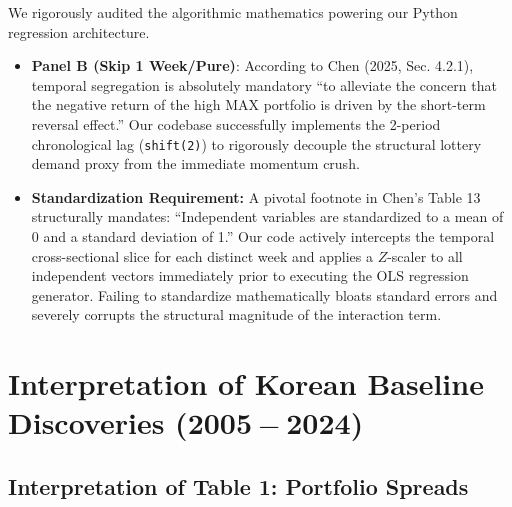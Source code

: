 \documentclass[11pt,a4paper]{article}
\begin{document}
We rigorously audited the algorithmic mathematics powering our Python regression architecture.
\begin{itemize}
    \item \textbf{Panel B (Skip 1 Week/Pure)}: According to Chen (2025, Sec. 4.2.1), temporal segregation is absolutely mandatory ``to alleviate the concern that the negative return of the high MAX portfolio is driven by the short-term reversal effect.'' Our codebase successfully implements the 2-period chronological lag (\texttt{shift(2)}) to rigorously decouple the structural lottery demand proxy from the immediate momentum crush.
    \item \textbf{Standardization Requirement:} A pivotal footnote in Chen's Table 13 structurally mandates: ``Independent variables are standardized to a mean of 0 and a standard deviation of 1.'' Our code actively intercepts the temporal cross-sectional slice for each distinct week and applies a $Z$-scaler to all independent vectors immediately prior to executing the OLS regression generator. Failing to standardize mathematically bloats standard errors and severely corrupts the structural magnitude of the interaction term.
\end{itemize}

\section{Interpretation of Korean Baseline Discoveries ($\mathbf{2005 - 2024}$)}

\subsection{Interpretation of Table 1: Portfolio Spreads}
\end{document}
